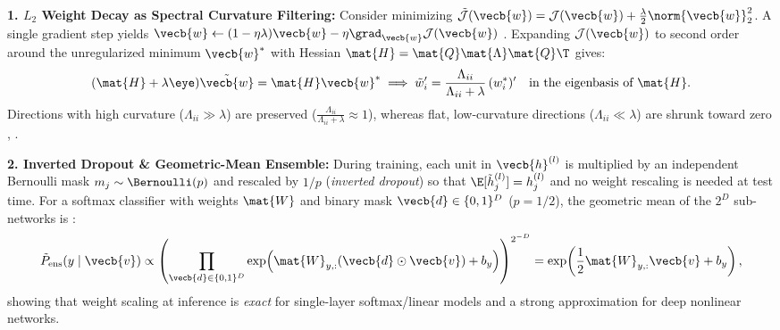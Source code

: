 \documentclass[../../../../master.tex]{subfiles}
\begin{document}
\begin{coremath}
\label{box:normres:reg_math}
\textbf{1. $L_2$ Weight Decay as Spectral Curvature Filtering:} Consider minimizing $\tilde{\mathcal{J}}(\vecb{w}) = \mathcal{J}(\vecb{w}) + \frac{\lambda}{2}\norm{\vecb{w}}_2^2$. A single gradient step yields $\vecb{w} \leftarrow (1 - \eta\lambda)\vecb{w} - \eta \grad_{\vecb{w}}\mathcal{J}(\vecb{w})$ . Expanding $\mathcal{J}(\vecb{w})$ to second order around the unregularized minimum $\vecb{w}^*$ with Hessian $\mat{H} = \mat{Q}\mat{\Lambda}\mat{Q}\T$ gives:
\begin{equation}
  (\mat{H} + \lambda\eye)\tilde{\vecb{w}} = \mat{H}\vecb{w}^*
  \implies \tilde{w}_i' = \frac{\Lambda_{ii}}{\Lambda_{ii} + \lambda}\,(w_i^*)' \quad \text{in the eigenbasis of } \mat{H}.
  \label{eq:normres:wd_curvature}
\end{equation}
Directions with high curvature ($\Lambda_{ii} \gg \lambda$) are preserved ($\frac{\Lambda_{ii}}{\Lambda_{ii}+\lambda} \approx 1$), whereas flat, low-curvature directions ($\Lambda_{ii} \ll \lambda$) are shrunk toward zero , .

\textbf{2. Inverted Dropout \& Geometric-Mean Ensemble:} During training, each unit in $\vecb{h}^{(l)}$ is multiplied by an independent Bernoulli mask $m_j \sim \Bernoulli(p)$ and rescaled by $1/p$ (\emph{inverted dropout}) so that $\E[\tilde{h}_j^{(l)}] = h_j^{(l)}$ and no weight rescaling is needed at test time. For a softmax classifier with weights $\mat{W}$ and binary mask $\vecb{d} \in \{0,1\}^D$ ($p=1/2$), the geometric mean of the $2^D$ sub-networks is :
\begin{equation}
  \tilde{P}_{\text{ens}}(y \mid \vecb{v}) \propto \left(\prod_{\vecb{d}\in\{0,1\}^D} \exp\!\left(\mat{W}_{y,:}(\vecb{d}\odot\vecb{v}) + b_y\right)\right)^{2^{-D}}
  = \exp\!\left(\frac{1}{2}\mat{W}_{y,:}\vecb{v} + b_y\right),
  \label{eq:normres:dropout_geomean}
\end{equation}
showing that weight scaling at inference is \emph{exact} for single-layer softmax/linear models and a strong approximation for deep nonlinear networks.
\end{coremath}
\end{document}
